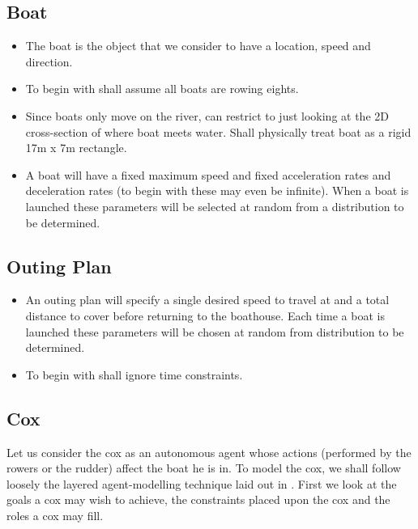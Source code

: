 \subsection{Boat}
\begin{itemize}
  \item The boat is the object that we consider to have a location, speed and direction.
  \item To begin with shall assume all boats are rowing eights.
  \item Since boats only move on the river, can restrict to just looking at the 2D cross-section of where boat
    meets water. Shall physically treat boat as a rigid 17m x 7m rectangle.
  \item A boat will have a fixed maximum speed and fixed acceleration
    rates and deceleration rates (to begin with these may even be
    infinite). When a boat is launched these parameters will be
    selected at random from a distribution to be determined.
\end{itemize}

\subsection{Outing Plan}
\begin{itemize}
  \item An outing plan will specify a single desired speed to travel at
    and a total distance to cover before returning to the
    boathouse. Each time a boat is launched these parameters will be
    chosen at random from distribution to be determined.
  \item To begin with shall ignore time constraints.
\end{itemize}

\subsection{Cox}
Let us consider the cox as an autonomous agent whose actions
(performed by the rowers or the rudder) affect the boat he is in. To
model the cox, we shall follow loosely the layered agent-modelling
technique laid out in \cite{Sterling2009}. First we look at the
goals a cox may wish to achieve, the constraints placed upon the cox
and the roles a cox may fill.

